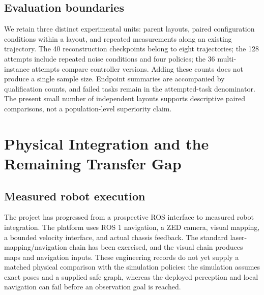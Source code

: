 \documentclass[11pt,a4paper]{article}
\providecommand{\hypertarget}[2]{#2}
\begin{document}
\hypertarget{evaluation-boundaries}{%
\subsection{Evaluation boundaries}\label{evaluation-boundaries}}

We retain three distinct experimental units: parent layouts, paired configuration conditions within a layout, and repeated measurements along an existing trajectory. The 40 reconstruction checkpoints belong to eight trajectories; the 128 attempts include repeated noise conditions and four policies; the 36 multi-instance attempts compare controller versions. Adding these counts does not produce a single sample size. Endpoint summaries are accompanied by qualification counts, and failed tasks remain in the attempted-task denominator. The present small number of independent layouts supports descriptive paired comparisons, not a population-level superiority claim.

\hypertarget{physical-integration-and-the-remaining-transfer-gap}{%
\section{Physical Integration and the Remaining Transfer Gap}\label{physical-integration-and-the-remaining-transfer-gap}}

\subsection{Measured robot execution}

The project has progressed from a prospective ROS interface to measured robot integration. The platform uses ROS 1 navigation, a ZED camera, visual mapping, a bounded velocity interface, and actual chassis feedback. The standard laser-mapping/navigation chain has been exercised, and the visual chain produces maps and navigation inputs. These engineering records do not yet supply a matched physical comparison with the simulation policies: the simulation assumes exact poses and a supplied safe graph, whereas the deployed perception and local navigation can fail before an observation goal is reached.
\end{document}
